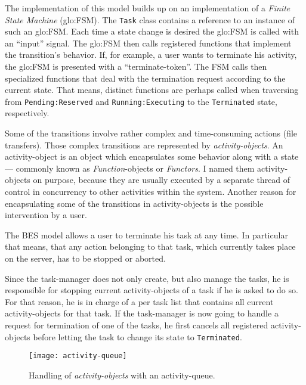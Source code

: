 The  implementation of  this model  builds up  on an  implementation  of a
\emph{Finite  State  Machine}  (\gls{glo:FSM}).  The  \texttt{Task}  class
contains a reference to an instance  of such an \gls{glo:FSM}. Each time a
state  change is  desired the  \gls{glo:FSM} is  called with  an ``input''
signal. The  \gls{glo:FSM} then calls registered  functions that implement
the transition's behavior. If, for example, a user wants to terminate his
activity, the  \gls{glo:FSM} is presented with  a ``terminate-token''. The
FSM  calls  then specialized  functions  that  deal  with the  termination
request according to the current state. That means, distinct functions are
perhaps   called  when   traversing  from   \texttt{Pending:Reserved}  and
\texttt{Running:Executing} to the \texttt{Terminated} state, respectively.

Some of the transitions  involve rather complex and time-consuming actions
(\eg  file  transfers).   Those  complex transitions  are  represented  by
\emph{activity-objects}.    An   activity-object   is  an   object   which
encapsulates  some behavior  along  with  a state  ---  commonly known  as
\emph{Function}-objects or \emph{Functors}.  I named them activity-objects
on  purpose, because they  are usually  executed by  a separate  thread of
control  in concurrency  to other  activities within  the  system. Another
reason for  encapsulating some of  the transitions in  activity-objects is
the possible intervention by a user.

The  BES model  allows a  user to  terminate his  task at  any  time.  In
particular  that means,  that any  action  belonging to  that task,  which
currently takes place on the server, has to be stopped or aborted.

Since the task-manager does not only create, but also manage the tasks, he
is responsible  for stopping current activity-objects  of a task  if he is
asked to do so.  For that reason, he  is in charge of a per task list that
contains all  current activity-objects for that task.  If the task-manager
is now going to  handle a request for termination of one  of the tasks, he
first cancels  all registered activity-objects before letting  the task to
change its state to \texttt{Terminated}.

\begin{figure}[ht]
  \centering
  \texttt{[image: activity-queue]}
  \caption{Handling of \emph{activity-objects} with an activity-queue.}
  \label{fig:activity-queue}
\end{figure}

